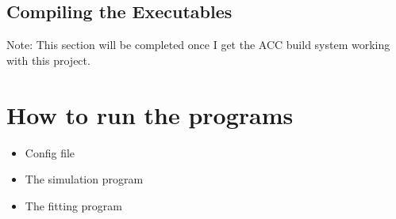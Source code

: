 \documentclass[12pt]{article}
\begin{document}
\subsection{Compiling the Executables}
Note: This section will be completed once I get the ACC build system working with this project.


\section{How to run the programs}
\begin{itemize}
\item
Config file

\item
The simulation program

\item
The fitting program

\end{itemize}
\end{document}
